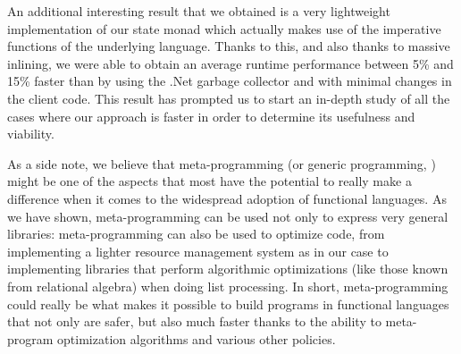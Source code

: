 An additional interesting result that we obtained is a very lightweight implementation of our state monad which actually makes use of the imperative functions of the underlying language. Thanks to this, and also thanks to massive inlining, we were able to obtain an average runtime performance between 5\% and 15\% faster than by using the .Net garbage collector and with minimal changes in the client code. This result has prompted us to start an in-depth study of all the cases where our approach is faster in order to determine its usefulness and viability.

As a side note, we believe that meta-programming (or generic programming, \cite{6_1,6_2,6_3,6_4,6_5,6_7,6_8,6_9}) might be one of the aspects that most have the potential to really make a difference when it comes to the widespread adoption of functional languages. As we have shown, meta-programming can be used not only to express very general libraries: meta-programming can also be used to optimize code, from implementing a lighter resource management system as in our case to implementing libraries that perform algorithmic optimizations (like those known from relational algebra) when doing list processing. In short, meta-programming could really be what makes it possible to build programs in functional languages that not only are safer, but also much faster thanks to the ability to meta-program optimization algorithms and various other policies.


